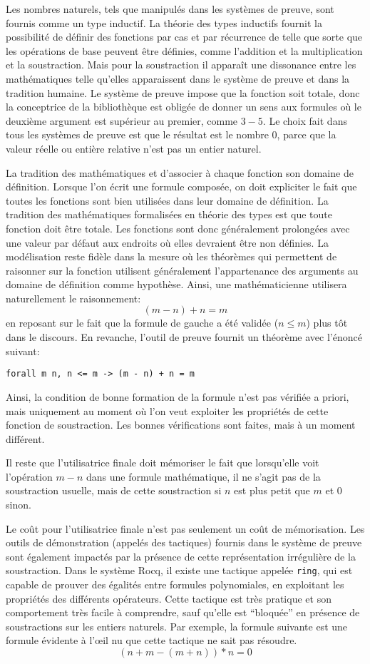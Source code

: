 \documentclass{jflart}
\begin{document}
Les nombres naturels, tels que manipulés dans les systèmes de preuve,
sont fournis comme un type inductif.  La théorie des types inductifs
fournit la possibilité de définir des fonctions par cas et par
récurrence de telle que sorte
que les opérations de base peuvent être définies, comme l'addition et
la multiplication et la soustraction.  Mais pour la soustraction
il apparaît une dissonance entre les
mathématiques telle qu'elles apparaissent dans le système de preuve et
dans la tradition humaine.  Le système de preuve impose
que la fonction soit totale, donc la conceptrice de la bibliothèque est
obligée de donner un sens aux formules où le deuxième argument est supérieur au
premier, comme \(3 - 5\).  Le choix fait
dans tous les systèmes de preuve est que le résultat est le nombre
\(0\), parce que la valeur réelle ou entière relative n'est pas un
entier naturel.

La tradition des mathématiques et d'associer à chaque fonction son
domaine de définition.  Lorsque l'on écrit une formule composée, on
doit expliciter le fait que toutes les fonctions sont bien utilisées
dans leur domaine de définition.  La tradition des mathématiques
formalisées en théorie des types est que toute fonction doit être
totale.  Les fonctions sont donc généralement prolongées avec une valeur
par défaut aux endroits où elles devraient être
non définies.  La modélisation reste fidèle dans la mesure où les
théorèmes qui permettent de raisonner sur la fonction utilisent
généralement l'appartenance des arguments au domaine de définition
comme hypothèse.  Ainsi, une mathématicienne utilisera naturellement
le raisonnement:
\[(m - n) + n = m\]
en reposant sur le fait que la formule de gauche a été validée (\(n
\leq m\)) plus tôt dans le discours.  En revanche, l'outil de preuve
fournit un théorème avec l'énoncé suivant:
\begin{verbatim}
forall m n, n <= m -> (m - n) + n = m
\end{verbatim}
Ainsi, la condition de bonne formation de la formule n'est pas
vérifiée a priori, mais uniquement au moment où l'on veut exploiter
les propriétés de cette fonction de soustraction.  Les bonnes
vérifications sont faites, mais à un moment différent.

Il reste que l'utilisatrice finale doit mémoriser le fait que
lorsqu'elle voit l'opération \(m - n\) dans une formule mathématique,
il ne s'agit pas de la soustraction usuelle, mais de cette
soustraction si \(n\) est plus petit que \(m\) et 0 sinon.

Le coût pour l'utilisatrice finale n'est pas seulement un coût de
mémorisation.  Les outils de démonstration (appelés des tactiques)
fournis dans le système de preuve sont également impactés par la
présence de cette représentation irrégulière de la soustraction.
Dans le système Rocq, il existe une tactique appelée \texttt{ring}, qui
est capable de prouver des égalités entre formules polynomiales, en
exploitant les propriétés des différents opérateurs.  Cette tactique
est très pratique et son comportement très facile à comprendre, sauf
qu'elle est ``bloquée'' en présence de soustractions sur les entiers
naturels.  Par exemple, la formule suivante est une formule évidente à
l'œil nu que cette tactique ne sait pas résoudre.
\[(n + m - (m + n)) * n = 0\]
\end{document}
